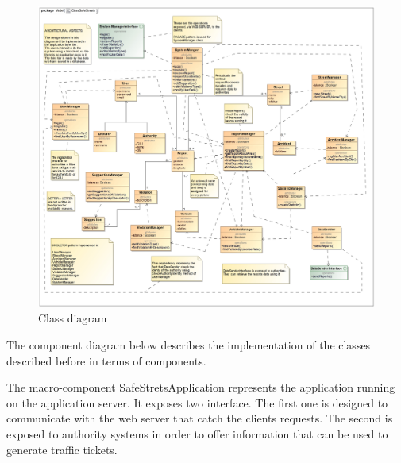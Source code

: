 \begin{figure}[H]
	\centering
	\includegraphics[width=1.12\linewidth]{Images/ClassSafeStreets.jpg}
	\caption{Class diagram}
\end{figure}

The component diagram below describes the implementation of the classes described before in terms of components.

The macro-component SafeStretsApplication represents the application running on the application server. It exposes two interface. The first one is designed to communicate with the web server that catch the clients requests. The second is exposed to authority systems in order to offer information that can be used to generate traffic tickets.

